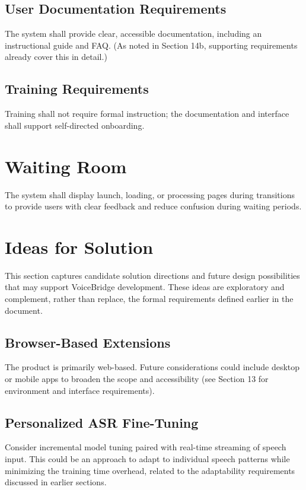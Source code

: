 \documentclass[11pt]{article}
\begin{document}
\subsection{User Documentation Requirements}
The system shall provide clear, accessible documentation, including an instructional guide and FAQ. (As noted in Section 14b, supporting requirements already cover this in detail.)

\subsection{Training Requirements}
Training shall not require formal instruction; the documentation and interface shall support self-directed onboarding.

\section{Waiting Room}
The system shall display launch, loading, or processing pages during transitions to provide users with clear feedback and reduce confusion during waiting periods.

\section{Ideas for Solution}

This section captures candidate solution directions and future design possibilities that may support VoiceBridge development. These ideas are exploratory and complement, rather than replace, the formal requirements defined earlier in the document.

\subsection{Browser-Based Extensions}
The product is primarily web-based. Future considerations could include desktop or mobile apps to broaden the scope and accessibility (see Section 13 for environment and interface requirements).

\subsection{Personalized ASR Fine-Tuning}
Consider incremental model tuning paired with real-time streaming of speech input. This could be an approach to adapt to individual speech patterns while minimizing the training time overhead, related to the adaptability requirements discussed in earlier sections.
\end{document}
